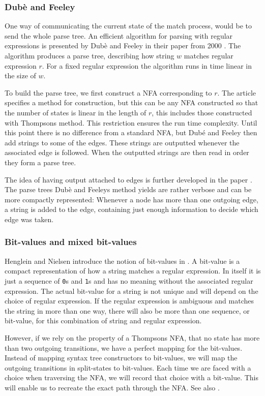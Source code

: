 \subsubsection{Dubè and Feeley}
One way of communicating the current state of the match process, would
be to send the whole parse tree. An efficient algorithm for parsing
with regular expressions is presented by Dubè and Feeley in their
paper from 2000 \cite{Dube2000}. The algorithm produces a parse tree,
describing how string $w$ matches regular expression $r$. For a fixed
regular expression the algorithm runs in time linear in the size of
$w$.

To build the parse tree, we first construct a NFA corresponding to
$r$. The article specifies a method for construction, but this can be
any NFA constructed so that the number of states is linear in the
length of $r$, this includes those constructed with Thompsons
method\cite{Thompson1968}. This restriction ensures the run time
complexity. Until this point there is no difference from a standard
NFA, but Dubé and Feeley then add strings to some of the edges. These
strings are outputted whenever the associated edge is followed. When
the outputted strings are then read in order they form a parse tree.

The idea of having output attached to edges is further developed in
the paper \cite{Henglein2010}. The parse trees Dubè and Feeleys method
yields are rather verbose and can be more compactly represented:
Whenever a node has more than one outgoing edge, a string is added to
the edge, containing just enough information to decide which edge was
taken.


\subsubsection{Bit-values and mixed bit-values}

Henglein and Nielsen introduce the notion of bit-values in
\cite{Henglein2010}. A bit-value is a compact representation of how a
string matches a regular expression. In itself it is just a sequence
of \texttt{0}s and \texttt{1}s and has no meaning without the
associated regular expression. The actual bit-value for a string is
not unique and will depend on the choice of regular expression. If the
regular expression is ambiguous and matches the string in more than
one way, there will also be more than one sequence, or bit-value, for
this combination of string and regular expression.

However, if we rely on the property of a Thompsons NFA, that no state
has more than two outgoing transitions, we have a perfect mapping for
the bit-values. Instead of mapping syntax tree constructors to
bit-values, we will map the outgoing transitions in split-states to
bit-values. Each time we are faced with a choice when traversing the
NFA, we will record that choice with a bit-value. This will enable us
to recreate the exact path through the NFA. See also \cite{Dube2000}.

